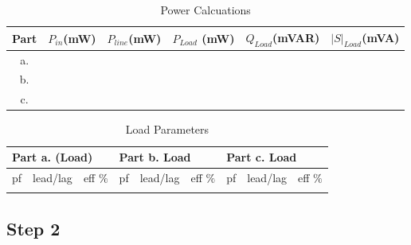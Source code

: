 \documentclass[letterpaper,12pt]{article}
\begin{document}
\begin{table}[H]
    \begin{center}
        \caption{Power Calcuations}
        \vspace{2mm}
        \begin{tabular}{||c | c | c | c | c | c ||} 
            \hline
            Part & \(P_{in}\)\newline (mW) & \(P_{line}\)\newline (mW) & \(P_{Load}\) \newline (mW) &\(Q_{Load}\)\newline (mVAR) & \(|S|_{Load}\)\newline(mVA)   \\ [0.5ex] 
            \hline\hline
            a. & &  & & &    \\ 
            \hline
            b. & &  & & &     \\
            \hline
            c. & &  & & &    \\ [1ex] 
            \hline
        \end{tabular}
\end{center}
\end{table}




\begin{table}[H]
  \begin{center}
    \caption{Load Parameters}
    \vspace{2mm}
 \begin{tabular}{||lll|lll|lll||}
    \hline
    \multicolumn{3}{|l|}{Part a. (Load)}                            & \multicolumn{3}{l|}{Part b. Load}                            & \multicolumn{3}{l|}{Part c. Load}                            \\ \hline
    \multicolumn{1}{|l|}{pf} & \multicolumn{1}{l|}{lead/lag} & eff \(\%\) & \multicolumn{1}{l|}{pf} & \multicolumn{1}{l|}{lead/lag} &eff \(\%\)  & \multicolumn{1}{l|}{pf} & \multicolumn{1}{l|}{lead/lag} &eff \(\%\)  \\ \hline
    \multicolumn{1}{|l|}{} & \multicolumn{1}{l|}{} &  & \multicolumn{1}{l|}{} & \multicolumn{1}{l|}{} &  & \multicolumn{1}{l|}{} & \multicolumn{1}{l|}{} &  \\ \hline
    \end{tabular}
\end{center}

\end{table}
\subsection{Step 2}
\end{document}
